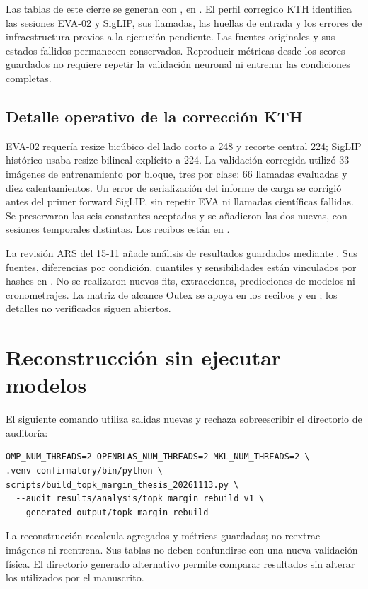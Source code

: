 Las tablas de este cierre se generan con , en . El perfil corregido KTH identifica las sesiones EVA-02 y SigLIP, sus llamadas, las huellas de entrada y los errores de infraestructura previos a la ejecución pendiente. Las fuentes originales y sus estados fallidos permanecen conservados. Reproducir métricas desde los scores guardados no requiere repetir la validación neuronal ni entrenar las condiciones completas.

\subsection{Detalle operativo de la corrección KTH}\label{sec:ars-kth-infra}
EVA-02 requería resize bicúbico del lado corto a 248 y recorte central 224; SigLIP histórico usaba resize bilineal explícito a 224. La validación corregida utilizó 33 imágenes de entrenamiento por bloque, tres por clase: 66 llamadas evaluadas y diez calentamientos. Un error de serialización del informe de carga se corrigió antes del primer forward SigLIP, sin repetir EVA ni llamadas científicas fallidas. Se preservaron las seis constantes aceptadas y se añadieron las dos nuevas, con sesiones temporales distintas. Los recibos están en .

La revisión ARS del 15-11 añade análisis de resultados guardados mediante . Sus fuentes, diferencias por condición, cuantiles y sensibilidades están vinculados por hashes en . No se realizaron nuevos fits, extracciones, predicciones de modelos ni cronometrajes. La matriz de alcance Outex se apoya en los recibos y en ; los detalles no verificados siguen abiertos.

\section{Reconstrucción sin ejecutar modelos}\label{sec:trazabilidad}
El siguiente comando utiliza salidas nuevas y rechaza sobreescribir el directorio de auditoría:
\begin{lstlisting}[basicstyle=\ttfamily\scriptsize,breaklines=true]
OMP_NUM_THREADS=2 OPENBLAS_NUM_THREADS=2 MKL_NUM_THREADS=2 \
.venv-confirmatory/bin/python \
scripts/build_topk_margin_thesis_20261113.py \
  --audit results/analysis/topk_margin_rebuild_v1 \
  --generated output/topk_margin_rebuild
\end{lstlisting}
La reconstrucción recalcula agregados y métricas guardadas; no reextrae imágenes ni reentrena. Sus tablas no deben confundirse con una nueva validación física. El directorio generado alternativo permite comparar resultados sin alterar los utilizados por el manuscrito.


